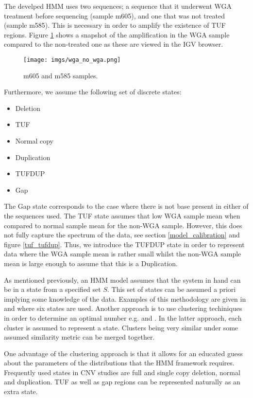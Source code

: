 The develped HMM uses two sequences; a sequence that it underwent WGA treatment before sequencing (sample  m605), and  one that was not treated (sample m585). 
This is necessary in order to amplify the existence of TUF regions.  Figure \ref{wga_no_wga } shows a snapshot of the amplification in the WGA sample compared to the non-treated one as these are viewed in the IGV browser.


\begin{figure}[!htb]
	\begin{center}
		\texttt{[image: imgs/wga\_no\_wga.png]}
	\end{center}
	\caption{m605 and m585 samples.}
	\label{wga_no_wga }
\end{figure}

Furthermore, we assume the following set of discrete states:

\begin{itemize}
	\item Deletion
	\item TUF
	\item Normal copy
	\item Duplication
	\item TUFDUP
	\item Gap
\end{itemize}

The Gap state  corresponds to the case where there is not base present in either of the sequences used. The TUF state assumes that low WGA sample mean when compared to normal sample mean for the non-WGA sample. However, this does not fully capture the spectrum of the data, see section \ref{model_calibration} and figure \ref{tuf_tufdup}.  Thus, we introduce the  TUFDUP state in order to represent data where the WGA sample mean is rather small whilst the non-WGA sample mean is large enough to assume that this is a Duplication.

As mentioned previously, an HMM model assumes that the system in hand can be in a state from a specified set $S$. This set of states can be assumed a priori implying some knowledge of the data. Examples of this methodology are given in \cite{coella2007} and \cite{Wang2007}  where six states are used. 
Another approach is to use clustering techiniques in order to determine an optimal number e.g. \cite{fridlyand2004} and \cite{liu2017}. In the latter approach, each cluster is assumed to represent a state. Clusters being very similar under some assumed similarity metric can be merged together.  

One advantage of the clustering approach is that it allows for an educated guess about the parameters of the distributions that the HMM framework requires. Frequently used states in CNV studies are full and single copy deletion, normal and duplication. TUF as well as gap regions can be represented naturally as an extra state. 

